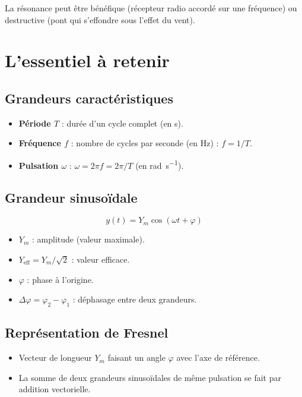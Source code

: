 \begin{remarque}
La résonance peut être bénéfique (récepteur radio accordé sur une fréquence) ou destructive (pont qui s'effondre sous l'effet du vent).
\end{remarque}

\section{L'essentiel à retenir}

\begin{synthese}
\subsection*{Grandeurs caractéristiques}
\begin{itemize}
\item \textbf{Période $T$} : durée d'un cycle complet (en \si{\second}).
\item \textbf{Fréquence $f$} : nombre de cycles par seconde (en \si{\hertz}) : $f = 1/T$.
\item \textbf{Pulsation $\omega$} : $ \omega = 2\pi f = 2\pi/T$ (en \si{\radian\per\second}).
\end{itemize}

\subsection*{Grandeur sinusoïdale}
\[
y(t) = Y_m \cos(\omega t + \varphi)
\]
\begin{itemize}
\item $Y_m$ : amplitude (valeur maximale).
\item $Y_{\text{eff}} = Y_m/\sqrt{2}$ : valeur efficace.
\item $\varphi$ : phase à l'origine.
\item $\Delta\varphi = \varphi_2 - \varphi_1$ : déphasage entre deux grandeurs.
\end{itemize}

\subsection*{Représentation de Fresnel}
\begin{itemize}
\item Vecteur de longueur $Y_m$ faisant un angle $\varphi$ avec l'axe de référence.
\item La somme de deux grandeurs sinusoïdales de même pulsation se fait par addition vectorielle.
\end{itemize}


\end{synthese}
